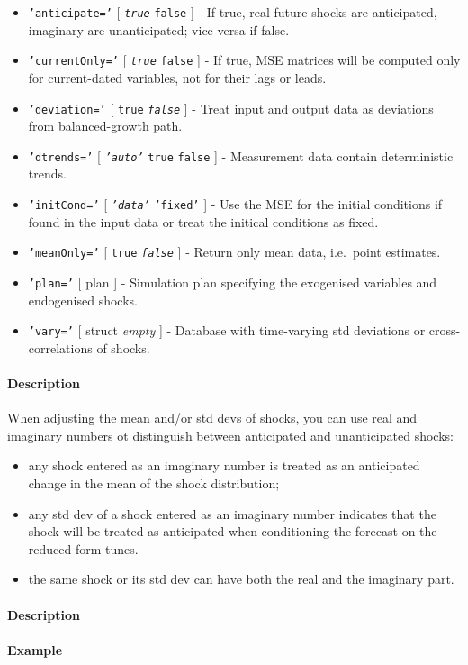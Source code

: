  \begin{itemize}
 \item
   \texttt{'anticipate='} {[} \emph{\texttt{true}} \textbar{}
   \texttt{false} {]} - If true, real future shocks are anticipated,
   imaginary are unanticipated; vice versa if false.
 \item
   \texttt{'currentOnly='} {[} \emph{\texttt{true}} \textbar{}
   \texttt{false} {]} - If true, MSE matrices will be computed only for
   current-dated variables, not for their lags or leads.
 \item
   \texttt{'deviation='} {[} \texttt{true} \textbar{}
   \emph{\texttt{false}} {]} - Treat input and output data as deviations
   from balanced-growth path.
 \item
   \texttt{'dtrends='} {[} \emph{\texttt{'auto'}} \textbar{}
   \texttt{true} \textbar{} \texttt{false} {]} - Measurement data contain
   deterministic trends.
 \item
   \texttt{'initCond='} {[} \emph{\texttt{'data'}} \textbar{}
   \texttt{'fixed'} {]} - Use the MSE for the initial conditions if found
   in the input data or treat the initical conditions as fixed.
 \item
   \texttt{'meanOnly='} {[} \texttt{true} \textbar{}
   \emph{\texttt{false}} {]} - Return only mean data, i.e.~point
   estimates.
 \item
   \texttt{'plan='} {[} plan {]} - Simulation plan specifying the
   exogenised variables and endogenised shocks.
 \item
   \texttt{'vary='} {[} struct \textbar{} \emph{empty} {]} - Database
   with time-varying std deviations or cross-correlations of shocks.
 \end{itemize}
 
 \paragraph{Description}
 
 When adjusting the mean and/or std devs of shocks, you can use real and
 imaginary numbers ot distinguish between anticipated and unanticipated
 shocks:
 
 \begin{itemize}
 \item
   any shock entered as an imaginary number is treated as an anticipated
   change in the mean of the shock distribution;
 \item
   any std dev of a shock entered as an imaginary number indicates that
   the shock will be treated as anticipated when conditioning the
   forecast on the reduced-form tunes.
 \item
   the same shock or its std dev can have both the real and the imaginary
   part.
 \end{itemize}
 
 \paragraph{Description}
 
 \paragraph{Example}


